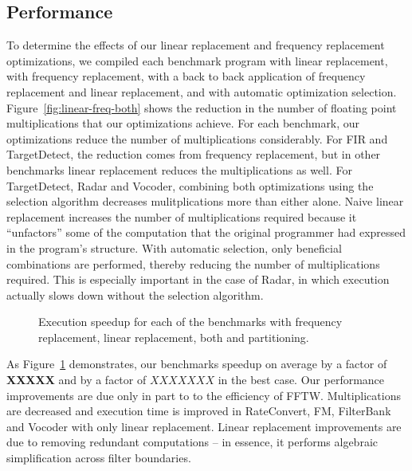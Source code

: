\subsection{Performance}
To determine the effects of our linear replacement and frequency
replacement optimizations, we compiled each benchmark program with
linear replacement, with frequency replacement, with a back to back
application of frequency replacement and linear replacement, and with
automatic optimization selection.  Figure~\ref{fig:linear-freq-both}
shows the reduction in the number of floating point multiplications
that our optimizations achieve.  For each benchmark, our optimizations
reduce the number of multiplications considerably. For FIR and
TargetDetect, the reduction comes from frequency replacement, but in
other benchmarks linear replacement reduces the multiplications as
well. For TargetDetect, Radar and Vocoder, combining both
optimizations using the selection algorithm decreases mulitplications
more than either alone. Naive linear replacement increases the number
of multiplications required because it ``unfactors'' some of the
computation that the original programmer had expressed in the
program's structure. With automatic selection, only beneficial
combinations are performed, thereby reducing the number of
multiplications required.  This is especially important in the case of
Radar, in which execution actually slows down without the selection
algorithm.

\begin{figure}[t]
\center
\epsfxsize=3.2in
\vspace{-6pt}
\caption{Execution speedup for each of the benchmarks with 
  frequency replacement, linear replacement, both and partitioning.}
\label{fig:execution-speedup}
\vspace{-6pt}
\end{figure}


As Figure~\ref{fig:execution-speedup} demonstrates, our benchmarks
speedup on average by a factor of {\bf XXXXX} and by a factor of
$XXXXXXX$ in the best case.  Our performance improvements are due only
in part to to the efficiency of FFTW.  Multiplications are decreased
and execution time is improved in RateConvert, FM, FilterBank and
Vocoder with only linear replacement. Linear replacement improvements
are due to removing redundant computations -- in essence, it performs
algebraic simplification across filter boundaries.

